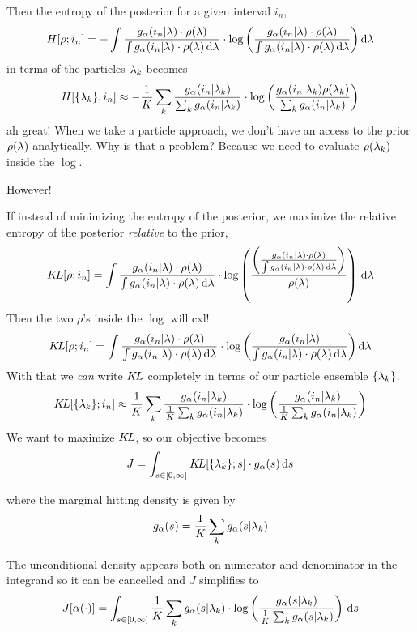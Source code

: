 \documentclass{article}
\begin{document}
Then the entropy of the posterior for a given interval $i_n$,
$$
H[\rho; i_n] = 
-\int \frac{g_{\alpha}(i_n| {\lambda}) \cdot \rho({\lambda})}
		{\int g_{\alpha}(i_n| {\lambda}) \cdot \rho({\lambda}) \, \mathrm{d} {\lambda}}
		\cdot \log\bigg( \frac{g_{\alpha}(i_n| {\lambda}) \cdot \rho({\lambda})}
		{\int g_{\alpha}(i_n| {\lambda}) \cdot \rho({\lambda}) \, \mathrm{d} {\lambda}} \bigg) \, \mathrm{d} {\lambda} 
$$
in terms of the particles ${\lambda}_k$ becomes 
$$
H[\{{\lambda}_k\}; i_n] 
\approx 
-\frac 1K \sum_k  \frac{ g_{\alpha}(i_n | {\lambda}_k)}
			 	      { \sum_k g_{\alpha}(i_n | {\lambda}_k)}
			 	      \cdot
			 	       \log\left( \frac{ g_{\alpha}( i_n | {\lambda}_k) \rho({\lambda}_k)}
			 	       				   { \sum_k g_{\alpha}(i_n | {\lambda}_k)     } 
			 			   \right)		 			   
$$
ah great! When we take a particle approach, we don't have an access to the prior
$\rho({\lambda})$ analytically. Why is that a problem? 
Because we need to evaluate $\rho({\lambda}_k)$ inside the $\log$. 

However!

If instead of minimizing the entropy of the posterior, we maximize the relative
entropy of the posterior {\itshape relative} to the prior, 
$$
{ K\!L}[\rho; i_n] = 
\int \frac{g_{\alpha}(i_n| {\lambda}) \cdot \rho({\lambda})}
		{\int g_{\alpha}(i_n| {\lambda}) \cdot \rho({\lambda}) \, \mathrm{d} {\lambda}}
		\cdot 
		\log \left(\frac{ \bigg( \frac{g_{\alpha}(i_n| {\lambda}) \cdot \rho({\lambda})}
		{\int g_{\alpha}(i_n| {\lambda}) \cdot \rho({\lambda}) \, \mathrm{d} {\lambda}} \bigg)}{\rho({\lambda})}
		\right)\, \mathrm{d} {\lambda} $$
Then the two $\rho$'s inside the $\log$ will cxl!
$$
{ K\!L}[\rho; i_n] = 
\int \frac{g_{\alpha}(i_n| {\lambda}) \cdot \rho({\lambda})}
		{\int g_{\alpha}(i_n| {\lambda}) \cdot \rho({\lambda}) \, \mathrm{d} {\lambda}}
		\cdot \log \bigg( \frac{g_{\alpha}(i_n| {\lambda})}
		{\int g_{\alpha}(i_n| {\lambda}) \cdot \rho({\lambda}) \, \mathrm{d} {\lambda}} \bigg)\, \mathrm{d} {\lambda}
$$
With that we {\itshape can } write ${ K\!L}$ completely in terms of our particle
ensemble $\{{\lambda}_k\}$.
$$
{ K\!L}[\{{\lambda}_k\}; i_n] 
\approx 
\frac 1K \sum_k  \frac{ g_{\alpha}(i_n | {\lambda}_k)}
			 	      { \tfrac 1K \sum_k g_{\alpha}(i_n | {\lambda}_k)}
			 	      \cdot
			 	       \log\left( \frac{ g_{\alpha}( i_n | {\lambda}_k)       }
			 	       				   { \tfrac 1K \sum_k g_{\alpha}(i_n | {\lambda}_k) } 
			 			   \right)		 			   
$$
We want to maximize ${ K\!L}$, so our objective becomes
$$
J = \int_{s \in [0,\infty] } { K\!L}[\{{\lambda}_k\}; s] \cdot g_{\alpha}(s) \, \mathrm{d} s
$$

where the marginal hitting density is given by 
$$
g_{\alpha}(s) = \frac 1K \sum_k g_{\alpha}(s| {\lambda}_k)
$$

The unconditional density appears both on numerator and denominator in the
integrand so it can be cancelled and $J$ simplifies to 
\begin{equation}
J[{\alpha}(\cdot)] = \int_{s \in [0,\infty] } \frac 1K
\sum_k   g_{\alpha}(s | {\lambda}_k) \cdot \log\left( \frac{ g_{\alpha}( s | {\lambda}_k)       } { \tfrac
1K \sum_k g_{\alpha}(s | {\lambda}_k) } \right)
 \, \mathrm{d} s
 \label{eq:J_particles_KL}
\end{equation} 
\end{document}
